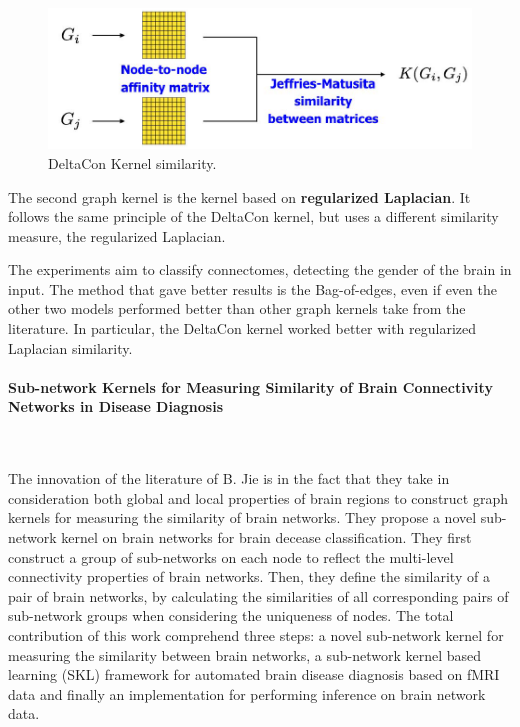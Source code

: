 \begin{figure}[htbp]
	\centering
	\includegraphics[scale=0.8]{Immagini/supervised2.PNG}
	\caption{DeltaCon Kernel similarity.}
	\label{fig:diagram14}
\end{figure}

The second graph kernel is the kernel based on \textbf{regularized Laplacian}. It follows the same principle of the DeltaCon kernel, but uses a different similarity measure, the regularized Laplacian.
\vspace{0.5cm}

The experiments aim to classify connectomes, detecting the gender of the brain in input. The method that gave better results is the Bag-of-edges, even if even the other two models performed better than other graph kernels take from the literature. In particular, the DeltaCon kernel worked better with regularized Laplacian similarity.

\paragraph{Sub-network Kernels for Measuring Similarity of Brain Connectivity Networks in Disease Diagnosis}\
\vspace{0.5cm}

The innovation of the literature of B. Jie \cite{Jie2018} is in the fact that they take in consideration both global and local properties of brain regions to construct graph kernels for measuring the similarity of brain networks. They propose a novel sub-network kernel on brain networks for brain decease classification. They first construct a group of sub-networks on each node to reflect the multi-level connectivity properties of brain networks. Then, they define the similarity of a pair of brain networks, by calculating the similarities of all corresponding pairs of sub-network groups when considering the uniqueness of nodes. The total contribution of this work comprehend three steps: a novel sub-network kernel for measuring the similarity between brain networks, a sub-network kernel based learning (SKL) framework for automated brain disease diagnosis based on fMRI data and finally an implementation for performing inference on brain network data.
\vspace{0.5cm}

